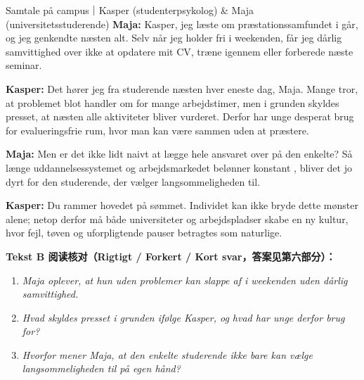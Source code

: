 \begin{emailbox}{Samtale på campus｜Kasper (studenterpsykolog) \& Maja (universitetsstuderende)}
\textbf{Maja:} Kasper, jeg læste om præstationssamfundet i går, og jeg genkendte næsten alt. Selv når jeg holder fri i weekenden, får jeg dårlig samvittighed over ikke at opdatere mit CV, træne igennem eller forberede næste seminar.

\textbf{Kasper:} Det hører jeg fra studerende næsten hver eneste dag, Maja. Mange tror, at problemet blot handler om for mange arbejdstimer, men i grunden skyldes presset, at næsten alle aktiviteter bliver vurderet. Derfor har unge desperat brug for evalueringsfrie rum, hvor man kan være sammen uden at præstere.

\textbf{Maja:} Men er det ikke lidt naivt at lægge hele ansvaret over på den enkelte? Så længe uddannelsessystemet og arbejdsmarkedet belønner konstant , bliver det jo dyrt for den studerende, der vælger langsommeligheden til.

\textbf{Kasper:} Du rammer hovedet på sømmet. Individet kan ikke bryde dette mønster alene; netop derfor må både universiteter og arbejdspladser skabe en ny kultur, hvor fejl, tøven og uforpligtende pauser betragtes som naturlige.
\end{emailbox}

\textbf{Tekst B 阅读核对（Rigtigt / Forkert / Kort svar，答案见第六部分）：}
\begin{enumerate}
  \item \textit{Maja oplever, at hun uden problemer kan slappe af i weekenden uden dårlig samvittighed.} \underline{\hspace{2.2cm}}
  \item \textit{Hvad skyldes presset i grunden ifølge Kasper, og hvad har unge derfor brug for?} \underline{\hspace{2.2cm}}
  \item \textit{Hvorfor mener Maja, at den enkelte studerende ikke bare kan vælge langsommeligheden til på egen hånd?} \underline{\hspace{2.2cm}}
\end{enumerate}

